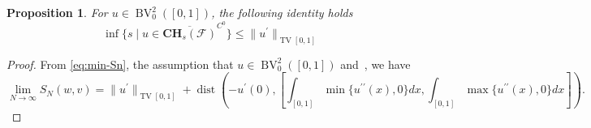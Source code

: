 \documentclass[12pt]{amsart}
\numberwithin{equation}{section}
\newtheorem{proposition}{Proposition}[section]
\theoremstyle{remark}
\begin{document}
\begin{proposition}
    For $ u \in \operatorname{BV}^2_0([0,1])$, the following identity holds
    \begin{equation}
        \inf \{ s \mid u \in \overline{\mathbf{CH}_s(\mathcal F)}^{C^0}\}
         \le \|{u^\prime}\|_{\operatorname{TV}[0,1]}
    \end{equation}
\end{proposition}
\begin{proof}
    From \eqref{eq:min-Sn}, the assumption that $u \in \operatorname{BV}^2_0([0,1])$ and~, we have
\begin{equation}
    \label{eq:limit_S_N}
    \lim_{N\to\infty} S_N(w,v) = \|u^\prime\|_{\operatorname{TV}[0,1]} + \operatorname{dist}\left(- u^\prime(0), \left[\int_{[0,1]}\min\{u^{\prime\prime}(x), 0\}dx, \int_{[0,1]}\max\{u^{\prime\prime}(x), 0\}dx\right]\right).
\end{equation}



\end{proof}
\end{document}
